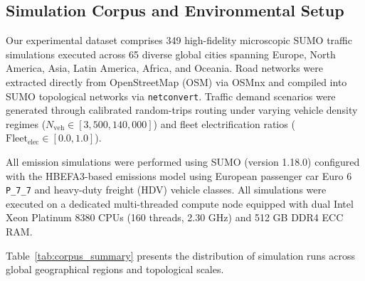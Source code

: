 \documentclass[journal]{IEEEtran}
\begin{document}
\subsection{Simulation Corpus and Environmental Setup}
Our experimental dataset comprises 349 high-fidelity microscopic SUMO traffic simulations executed across 65 diverse global cities spanning Europe, North America, Asia, Latin America, Africa, and Oceania. Road networks were extracted directly from OpenStreetMap (OSM) via OSMnx and compiled into SUMO topological networks via \texttt{netconvert}. Traffic demand scenarios were generated through calibrated random-trips routing under varying vehicle density regimes ($N_{\text{veh}} \in [3,500, 140,000]$) and fleet electrification ratios ($\text{Fleet}_{\text{elec}} \in [0.0, 1.0]$).

All emission simulations were performed using SUMO (version 1.18.0) \cite{Krajzewicz2012} configured with the HBEFA3-based emissions model \cite{Keller2017} using European passenger car Euro 6 \texttt{P\_7\_7} and heavy-duty freight (HDV) vehicle classes. All simulations were executed on a dedicated multi-threaded compute node equipped with dual Intel Xeon Platinum 8380 CPUs (160 threads, 2.30 GHz) and 512 GB DDR4 ECC RAM.

Table~\ref{tab:corpus_summary} presents the distribution of simulation runs across global geographical regions and topological scales.
\end{document}
